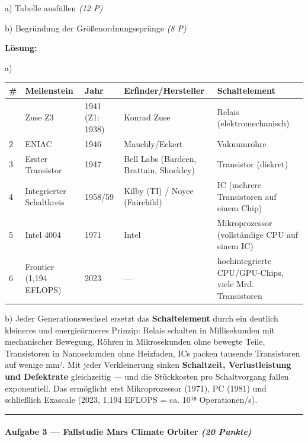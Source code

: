 \documentclass[11pt, a4paper]{article}
\begin{document}
a) Tabelle ausfüllen \textit{(12 P)}

b) Begründung der Größenordnungssprünge \textit{(8 P)}


\textbf{Lösung:}


a)



{\small
\begin{tabularx}{\linewidth}{XXXXX}
\hline
\rowcolor{tableheadbg}
{\color{white}\textbf{\#}} & {\color{white}\textbf{Meilenstein}} & {\color{white}\textbf{Jahr}} & {\color{white}\textbf{Erfinder/Hersteller}} & {\color{white}\textbf{Schaltelement}} \\[2pt]
\hline
\endhead
\hline
\endfoot
1 & Zuse Z3 & 1941 (Z1: 1938) & Konrad Zuse & Relais (elektromechanisch) \\
2 & ENIAC & 1946 & Mauchly/Eckert & Vakuumröhre \\
3 & Erster Transistor & 1947 & Bell Labs (Bardeen, Brattain, Shockley) & Transistor (diskret) \\
4 & Integrierter Schaltkreis & 1958/59 & Kilby (TI) / Noyce (Fairchild) & IC (mehrere Transistoren auf einem Chip) \\
5 & Intel 4004 & 1971 & Intel & Mikroprozessor (vollständige CPU auf einem IC) \\
6 & Frontier (1,194 EFLOPS) & 2023 & — & hochintegrierte CPU/GPU-Chips, viele Mrd. Transistoren \\
\end{tabularx}
}


b) Jeder Generationswechsel ersetzt das \textbf{Schaltelement} durch ein deutlich kleineres und energieärmeres Prinzip: Relais schalten in Millisekunden mit mechanischer Bewegung, Röhren in Mikrosekunden ohne bewegte Teile, Transistoren in Nanosekunden ohne Heizfaden, ICs packen tausende Transistoren auf wenige mm². Mit jeder Verkleinerung sinken \textbf{Schaltzeit, Verlustleistung und Defektrate} gleichzeitig — und die Stückkosten pro Schaltvorgang fallen exponentiell. Das ermöglicht erst Mikroprozessor (1971), PC (1981) und schließlich Exascale (2023, 1,194 EFLOPS = ca. 10¹⁸ Operationen/s).



\noindent\textcolor{rulegray}{\rule{\linewidth}{0.4pt}}


\paragraph{Aufgabe 3 — Fallstudie Mars Climate Orbiter \textit{(20 Punkte)}}\mbox{}\\[2pt]
\end{document}
